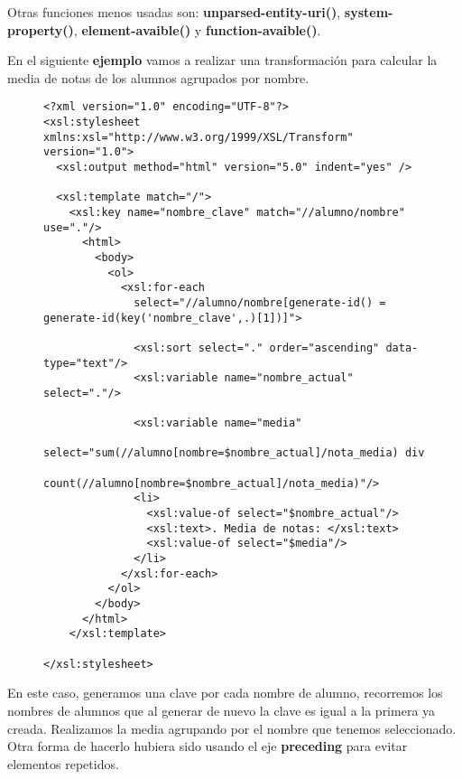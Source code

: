 Otras funciones menos usadas son: \textbf{unparsed-entity-uri()}, \textbf{system-property()}, \textbf{element-avaible()} y \textbf{function-avaible()}.

En el siguiente \textbf{ejemplo} vamos a realizar una transformación para calcular la media de notas de los alumnos agrupados por nombre.

\begin{figure}[H]
    \begin{tcolorbox}[sharp corners, colback=yellow!30, colframe=white!20]
        \tiny
\begin{verbatim}
<?xml version="1.0" encoding="UTF-8"?>
<xsl:stylesheet xmlns:xsl="http://www.w3.org/1999/XSL/Transform" version="1.0">
  <xsl:output method="html" version="5.0" indent="yes" />

  <xsl:template match="/">
    <xsl:key name="nombre_clave" match="//alumno/nombre" use="."/>
      <html>
        <body>
          <ol>
            <xsl:for-each
              select="//alumno/nombre[generate-id() = generate-id(key('nombre_clave',.)[1])]">

              <xsl:sort select="." order="ascending" data-type="text"/>
              <xsl:variable name="nombre_actual" select="."/>

              <xsl:variable name="media"
              select="sum(//alumno[nombre=$nombre_actual]/nota_media) div
              count(//alumno[nombre=$nombre_actual]/nota_media)"/>
              <li>
                <xsl:value-of select="$nombre_actual"/>
                <xsl:text>. Media de notas: </xsl:text>
                <xsl:value-of select="$media"/>
              </li>
            </xsl:for-each>
          </ol>
        </body>
      </html>
    </xsl:template>

</xsl:stylesheet>
\end{verbatim}
    \end{tcolorbox}
\end{figure}

En este caso, generamos una clave por cada nombre de alumno, recorremos los nombres de alumnos que al generar de nuevo la clave es igual a la primera ya creada. Realizamos la media agrupando por el nombre que tenemos seleccionado. Otra forma de hacerlo hubiera sido usando el eje \textbf{preceding} para evitar elementos repetidos.

